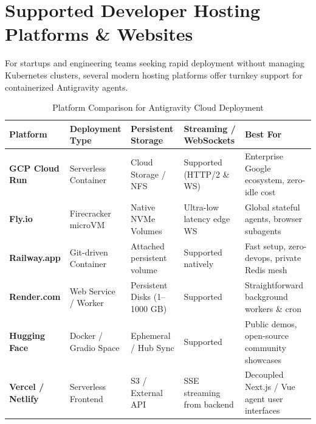 \documentclass[11pt,a4paper,oneside]{book}
\begin{document}
\section{Supported Developer Hosting Platforms \& Websites}
For startups and engineering teams seeking rapid deployment without managing Kubernetes clusters, several modern hosting platforms offer turnkey support for containerized Antigravity agents.

\begin{table}[htbp]
\centering
\caption{Platform Comparison for Antigravity Cloud Deployment}
\begin{tabularx}{\textwidth}{lXXXX}
\toprule
\textbf{Platform} & \textbf{Deployment Type} & \textbf{Persistent Storage} & \textbf{Streaming / WebSockets} & \textbf{Best For} \\
\midrule
\textbf{GCP Cloud Run} & Serverless Container & Cloud Storage / NFS & Supported (HTTP/2 \& WS) & Enterprise Google ecosystem, zero-idle cost \\
\textbf{Fly.io} & Firecracker microVM & Native NVMe Volumes & Ultra-low latency edge WS & Global stateful agents, browser subagents \\
\textbf{Railway.app} & Git-driven Container & Attached persistent volume & Supported natively & Fast setup, zero-devops, private Redis mesh \\
\textbf{Render.com} & Web Service / Worker & Persistent Disks (1--1000 GB) & Supported & Straightforward background workers \& cron \\
\textbf{Hugging Face} & Docker / Gradio Space & Ephemeral / Hub Sync & Supported & Public demos, open-source community showcases \\
\textbf{Vercel / Netlify} & Serverless Frontend & S3 / External API & SSE streaming from backend & Decoupled Next.js / Vue agent user interfaces \\
\bottomrule
\end{tabularx}
\end{table}
\end{document}
